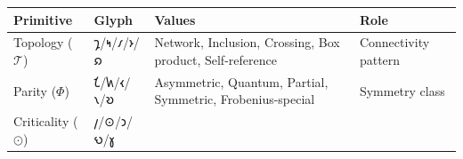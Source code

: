 \documentclass[12pt,a4paper]{article}
\begin{document}
\begin{longtable}[]{@{}llll@{}}
\toprule
\begin{minipage}[b]{0.30\columnwidth}\raggedright
Primitive\strut
\end{minipage} & \begin{minipage}[b]{0.19\columnwidth}\raggedright
Glyph\strut
\end{minipage} & \begin{minipage}[b]{0.22\columnwidth}\raggedright
Values\strut
\end{minipage} & \begin{minipage}[b]{0.17\columnwidth}\raggedright
Role\strut
\end{minipage}\tabularnewline
\midrule
\endhead
\begin{minipage}[t]{0.30\columnwidth}\raggedright
Topology (\(\mathcal{T}\))\strut
\end{minipage} & \begin{minipage}[t]{0.19\columnwidth}\raggedright
𐑡/𐑰/𐑥/𐑶/𐑸\strut
\end{minipage} & \begin{minipage}[t]{0.22\columnwidth}\raggedright
Network, Inclusion, Crossing, Box product, Self-reference\strut
\end{minipage} & \begin{minipage}[t]{0.17\columnwidth}\raggedright
Connectivity pattern\strut
\end{minipage}\tabularnewline
\begin{minipage}[t]{0.30\columnwidth}\raggedright
Parity (\(\Phi\))\strut
\end{minipage} & \begin{minipage}[t]{0.19\columnwidth}\raggedright
𐑗/𐑿/𐑬/𐑯/𐑹\strut
\end{minipage} & \begin{minipage}[t]{0.22\columnwidth}\raggedright
Asymmetric, Quantum, Partial, Symmetric, Frobenius-special\strut
\end{minipage} & \begin{minipage}[t]{0.17\columnwidth}\raggedright
Symmetry class\strut
\end{minipage}\tabularnewline
\begin{minipage}[t]{0.30\columnwidth}\raggedright
Criticality (\(\odot\))\strut
\end{minipage} & \begin{minipage}[t]{0.19\columnwidth}\raggedright
𐑢/⊙/𐑮/𐑻/𐑣\strut
\end{minipage} & \begin{minipage}[t]{0.22\columnwidth}\raggedright

\end{minipage}
\end{longtable}
\end{document}
